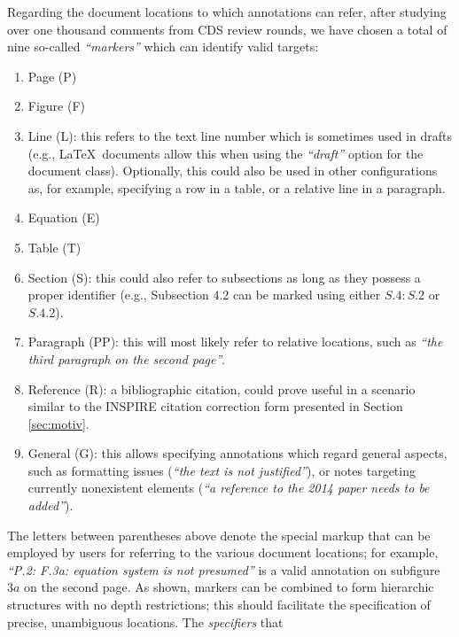 Regarding the document locations to which annotations can refer, after studying
over one thousand comments from CDS review rounds, we have chosen a total of
nine so-called \textit{``markers''} which can identify valid targets:
\begin{enumerate}
  \item Page (P)
  \item Figure (F)
  \item Line (L): this refers to the text line number which is sometimes used
                  in drafts (e.g., \LaTeX\ documents allow this when using the
                  \textit{``draft''} option for the document class). Optionally,
                  this could also be used in other configurations as, for
                  example, specifying a row in a table, or a relative line in a
                  paragraph.
  \item Equation (E)
  \item Table (T)
  \item Section (S): this could also refer to subsections as long as they
                     possess a proper identifier (e.g., Subsection 4.2 can be
                     marked using either $S.4: S.2$ or $S.4.2$).
  \item Paragraph (PP): this will most likely refer to relative locations, such
                        as \textit{``the third paragraph on the second page''}.
  \item Reference (R): a bibliographic citation, could prove useful in a
                       scenario similar to the INSPIRE citation correction 
                       form presented in Section \ref{sec:motiv}.
  \item General (G): this allows specifying annotations which regard general
                     aspects, such as formatting issues (\textit{``the text is
                     not justified''}), or notes targeting currently nonexistent
                     elements (\textit{``a reference to the 2014 paper needs to
                     be added''}).
\end{enumerate}
The letters between parentheses above denote the special markup that can be
employed by users for referring to the various document locations; for example,
\textit{``P.2: F.3a: equation system is not presumed''} is a valid annotation
on subfigure $3a$ on the second page. As shown, markers can be combined to form
hierarchic structures with no depth restrictions; this should facilitate the
specification of precise, unambiguous locations. The \textit{specifiers} that
